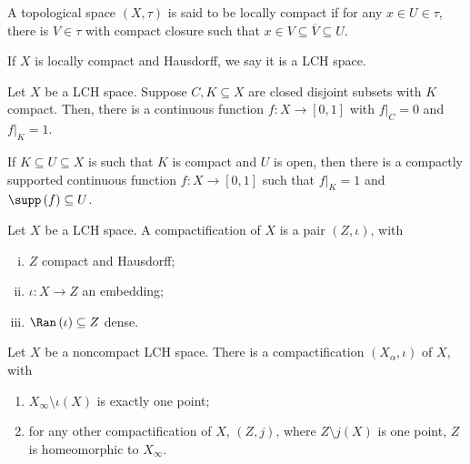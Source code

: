 \begin{definition}
  A topological space $\left(X,\tau\right)$ is said to be locally compact if for any $x\in U\in \tau$, there is $V\in \tau$ with compact closure such that $x\in V\subseteq \overline{V}\subseteq U$.\newline

  If $X$ is locally compact and Hausdorff, we say it is a LCH space.
\end{definition}
\begin{theorem}
  Let $X$ be a LCH space. Suppose $C,K\subseteq X$ are closed disjoint subsets with $K$ compact. Then, there is a continuous function $f\colon X\rightarrow [0,1]$ with $f|_{C} = 0$ and $f|_{K} = 1$.\newline

  If $K\subseteq U\subseteq X$ is such that $K$ is compact and $U$ is open, then there is a compactly supported continuous function $f\colon X\rightarrow [0,1]$ such that $f|_{K} = 1$ and $\supp\left(f\right)\subseteq U$.
\end{theorem}
\begin{definition}
  Let $X$ be a LCH space. A compactification of $X$ is a pair $\left(Z,\iota\right)$, with
  \begin{enumerate}[(i)]
    \item $Z$ compact and Hausdorff;
    \item $\iota\colon X\rightarrow Z$ an embedding;
    \item $\Ran\left(\iota\right)\subseteq Z$ dense.
  \end{enumerate}
\end{definition}
\begin{theorem}
  Let $X$ be a noncompact LCH space. There is a compactification $\left(X_{\alpha},\iota\right)$ of $X$, with
  \begin{enumerate}[(1)]
    \item $X_{\infty}\setminus \iota(X)$ is exactly one point;
    \item for any other compactification of $X$, $\left(Z,j\right)$, where $Z\setminus j(X)$ is one point, $Z$ is homeomorphic to $X_{\infty}$.
  \end{enumerate}
\end{theorem}
